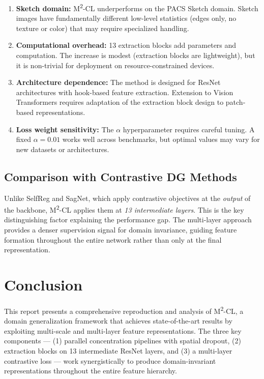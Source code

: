 \documentclass[12pt,a4paper]{article}
\begin{document}
\begin{enumerate}[leftmargin=2em]
  \item \textbf{Sketch domain:} M\textsuperscript{2}-CL underperforms on the PACS Sketch
  domain. Sketch images have fundamentally different low-level statistics (edges only,
  no texture or color) that may require specialized handling.

  \item \textbf{Computational overhead:} 13 extraction blocks add parameters and
  computation. The increase is modest (extraction blocks are lightweight), but it is
  non-trivial for deployment on resource-constrained devices.

  \item \textbf{Architecture dependence:} The method is designed for ResNet architectures
  with hook-based feature extraction. Extension to Vision Transformers requires adaptation
  of the extraction block design to patch-based representations.

  \item \textbf{Loss weight sensitivity:} The $\alpha$ hyperparameter requires careful
  tuning. A fixed $\alpha{=}0.01$ works well across benchmarks, but optimal values may
  vary for new datasets or architectures.
\end{enumerate}

\subsection{Comparison with Contrastive DG Methods}

Unlike SelfReg and SagNet, which apply contrastive objectives at the \emph{output} of the
backbone, M\textsuperscript{2}-CL applies them at \emph{13 intermediate layers}. This is
the key distinguishing factor explaining the performance gap. The multi-layer approach
provides a denser supervision signal for domain invariance, guiding feature formation
throughout the entire network rather than only at the final representation.

\section{Conclusion}
\label{sec:conclusion}

This report presents a comprehensive reproduction and analysis of M\textsuperscript{2}-CL,
a domain generalization framework that achieves state-of-the-art results by exploiting
multi-scale and multi-layer feature representations. The three key components —
(1) parallel concentration pipelines with spatial dropout, (2) extraction blocks on 13
intermediate ResNet layers, and (3) a multi-layer contrastive loss — work synergistically
to produce domain-invariant representations throughout the entire feature hierarchy.
\end{document}
